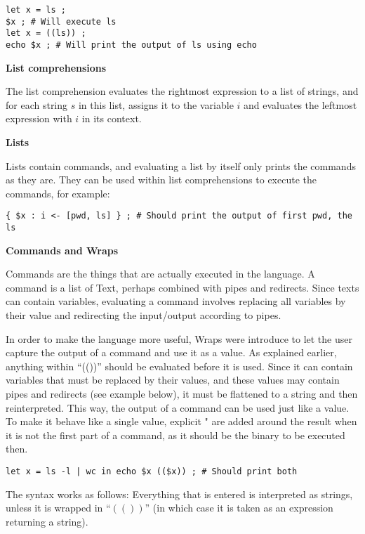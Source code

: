 \documentclass[11pt,a4paper]{article}
\begin{document}
\begin{verbatim}
let x = ls ;
$x ; # Will execute ls
let x = ((ls)) ;
echo $x ; # Will print the output of ls using echo
\end{verbatim}

\textbf{List comprehensions}

The list comprehension evaluates the rightmost expression to a list of strings,
and for each string $s$ in this list, assigns it to the variable $i$ and
evaluates the leftmost expression with $i$ in its context.

\textbf{Lists}

Lists contain commands, and evaluating a list by itself only prints the
commands as they are. They can be used within list comprehensions to execute
the commands, for example:

\begin{verbatim}
{ $x : i <- [pwd, ls] } ; # Should print the output of first pwd, the ls
\end{verbatim}

\textbf{Commands and Wraps}

Commands are the things that are actually executed in the language. A command
is a list of Text, perhaps combined with pipes and redirects. Since texts can
contain variables, evaluating a command involves replacing all variables by
their value and redirecting the input/output according to pipes.

In order to make the language more useful, Wraps were introduce to let the user
capture the output of a command and use it as a value. As explained earlier,
anything within ``(())'' should be evaluated before it is used. Since it can
contain variables that must be replaced by their values, and these values may
contain pipes and redirects (see example below), it must be flattened to a
string and then reinterpreted. This way, the output of a command can be used
just like a value. To make it behave like a single value, explicit " are added
around the result when it is not the first part of a command, as it should be
the binary to be executed then.

\begin{verbatim}
let x = ls -l | wc in echo $x (($x)) ; # Should print both
\end{verbatim}




The syntax works as follows: Everything that is entered is interpreted as
strings, unless it is wrapped in ``$\left( \left(  \right) \right)$'' (in which
case it is taken as an expression returning a string).
\end{document}
